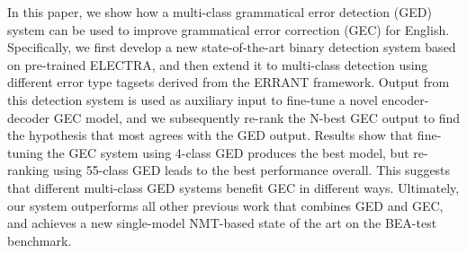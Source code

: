 In this paper, we show how a multi-class grammatical error detection (GED) system can be used to improve grammatical error correction (GEC) for English. Specifically, we first develop a new state-of-the-art binary detection system based on pre-trained ELECTRA, and then extend it to multi-class detection using different error type tagsets derived from the ERRANT framework. Output from this detection system is used as auxiliary input to fine-tune a novel encoder-decoder GEC model, and we subsequently re-rank the N-best GEC output to find the hypothesis that most agrees with the GED output. Results show that fine-tuning the GEC system using 4-class GED produces the best model, but re-ranking using 55-class GED leads to the best performance overall. This suggests that different multi-class GED systems benefit GEC in different ways. Ultimately, our system outperforms all other previous work that combines GED and GEC, and achieves a new single-model NMT-based state of the art on the BEA-test benchmark.
